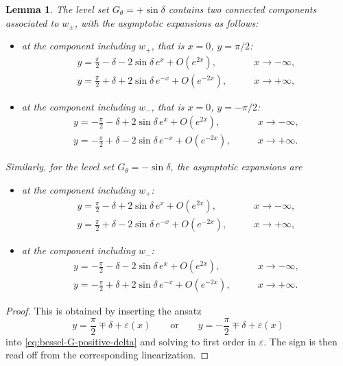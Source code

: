 \documentclass[11pt]{amsart}
\theoremstyle{plain}
\newtheorem{lem}[thm]{Lemma}
\begin{document}
\begin{lem}\label{lem:bessel-end-asymptotics}
The level set \(G_\theta=+\sin\delta\) contains two connected components associated to $w_{\pm}$, with the asymptotic expansions as follows:
\begin{itemize}
    \item at the component including $w_+$, that is $x=0$, $y=\pi/2$: 
    \begin{align*}
y=\frac{\pi}{2}-\delta-2\sin\delta\,e^x+O(e^{2x}),
&\qquad x\to -\infty,\\
y=\frac{\pi}{2}+\delta+2\sin\delta\,e^{-x}+O(e^{-2x}),
&\qquad x\to +\infty,
\end{align*}
   \item at the component including $w_-$, that is $x=0$, $y=-\pi/2$:
   \begin{align*}
y=-\frac{\pi}{2}-\delta+2\sin\delta\,e^x+O(e^{2x}),
&\qquad x\to -\infty,\\
y=-\frac{\pi}{2}+\delta-2\sin\delta\,e^{-x}+O(e^{-2x}),
&\qquad x\to +\infty.
\end{align*}
\end{itemize}
Similarly, for the level set \(G_\theta=-\sin\delta\), the asymptotic expansions are
\begin{itemize}
    \item at the component including $w_+$: 
\begin{align*}
y=\frac{\pi}{2}-\delta+2\sin\delta\,e^x+O(e^{2x}),
&\qquad x\to -\infty,\\
y=\frac{\pi}{2}+\delta-2\sin\delta\,e^{-x}+O(e^{-2x}),
&\qquad x\to +\infty,
\end{align*}
   \item at the component including $w_-$:
\begin{align*}
y=-\frac{\pi}{2}-\delta-2\sin\delta\,e^x+O(e^{2x}),
&\qquad x\to -\infty,\\
y=-\frac{\pi}{2}+\delta+2\sin\delta\,e^{-x}+O(e^{-2x}),
&\qquad x\to +\infty.
\end{align*}    
\end{itemize}
\end{lem}

\begin{proof}
This is obtained by inserting the ansatz
\[
y=\frac{\pi}{2}\mp\delta+\varepsilon(x)
\qquad\text{or}\qquad
y=-\frac{\pi}{2}\mp\delta+\varepsilon(x)
\]
into \eqref{eq:bessel-G-positive-delta} and solving to first order in \(\varepsilon\). The sign is then read off from the corresponding linearization.
\end{proof}
\end{document}
